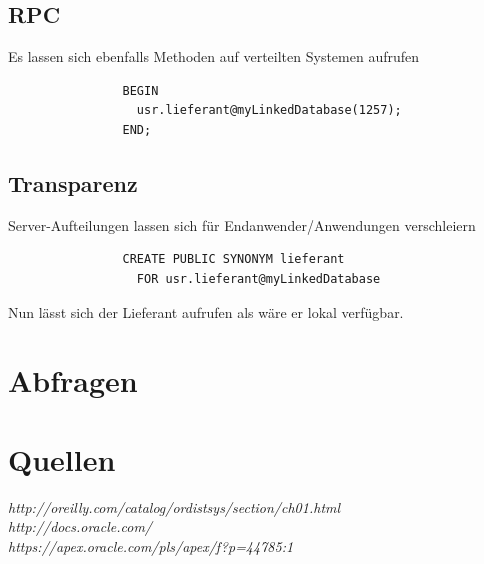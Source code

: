\documentclass[12pt,a4paper]{article}
\begin{document}
        \subsection{RPC}
            Es lassen sich ebenfalls Methoden auf verteilten Systemen aufrufen
            \begin{verbatim}
                BEGIN
                  usr.lieferant@myLinkedDatabase(1257);
                END;
            \end{verbatim}
         \subsection{Transparenz}
            Server-Aufteilungen lassen sich für Endanwender/Anwendungen verschleiern
            \begin{verbatim}
                CREATE PUBLIC SYNONYM lieferant
                  FOR usr.lieferant@myLinkedDatabase
            \end{verbatim}
            Nun lässt sich der Lieferant aufrufen als wäre er lokal verfügbar.

\section{Abfragen}
	\section{Quellen}
	\emph{http://oreilly.com/catalog/ordistsys/section/ch01.html}\\
	\emph{http://docs.oracle.com/}\\
	\emph{https://apex.oracle.com/pls/apex/f?p=44785:1}
	
\end{document}
